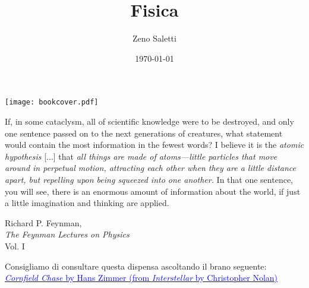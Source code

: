 \documentclass{book}
\title{Fisica}
\author{Zeno Saletti}
\date{\today}
\begin{document}
\begin{titlepage}
    \pagecolor{brown}\afterpage{\nopagecolor}
    \texttt{[image: bookcover.pdf]} %

    \restoregeometry
\end{titlepage}

\epigraph{If, in some cataclysm, all of scientific knowledge were
to be destroyed, and only one sentence passed on to the next generations
of creatures, what statement would contain the most information in the
fewest words? I believe it is the \textit{atomic hypothesis} [...]
that \textit{all things are made of atoms—little particles that move
around in perpetual motion, attracting each other when they are a little
distance apart, but repelling upon being squeezed into one another.}
In that one sentence, you will see, there is an enormous amount of
information about the world, if just a little imagination and
thinking are applied.}{Richard P. Feynman,\\\textit{The Feynman Lectures on Physics}\\Vol. I}

\vspace*{9cm}
\begin{center}
Consigliamo di consultare questa dispensa ascoltando il brano seguente:\\
\href{https://www.youtube.com/watch?v=JuSsvM8B4Jc}{\textcolor{blue}{\textit{Cornfield Chase} by Hans Zimmer (from \textit{Interstellar} by Christopher Nolan)}}
\end{center}

\newpage


\newpage



\dominitoc %
\tableofcontents












\end{document}
